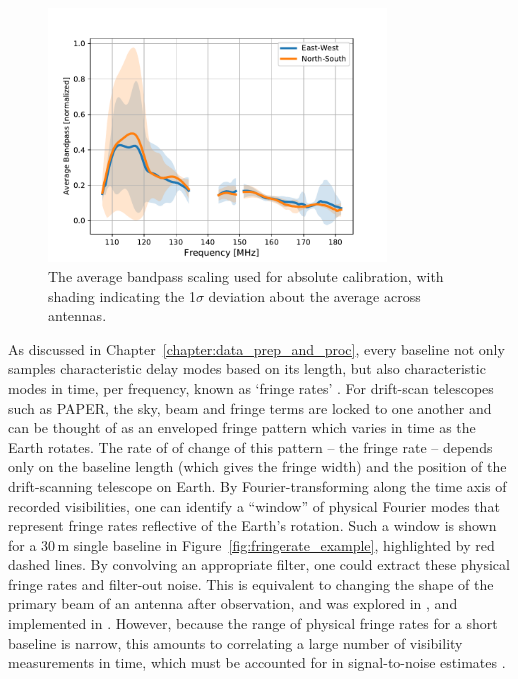 \begin{figure}
\centering
\includegraphics[width=0.8\textwidth]{chapters/psa128_pol/figures/avg_bandpasses.pdf}
\caption[The average bandpass scaling used for absolute calibration.]{The average bandpass scaling used for absolute calibration, with shading indicating the 1$\sigma$ deviation about the average across antennas.}
\label{fig:psa128_bandpases}
\end{figure}

As discussed in Chapter~\ref{chapter:data_prep_and_proc}, every baseline not only samples characteristic delay modes based on its length, but also characteristic modes in time, per frequency, known as `fringe rates' \citep[if frequency dependence is ignored, they are referred to as ``delay rates''; e.g.][]{ParsonsBacker.09}. For drift-scan telescopes such as PAPER, the sky, beam and fringe terms are locked to one another and can be thought of as an enveloped fringe pattern which varies in time as the Earth rotates. The rate of of change of this pattern -- the fringe rate -- depends only on the baseline length (which gives the fringe width) and the position of the drift-scanning telescope on Earth. By Fourier-transforming along the time axis of recorded visibilities, one can identify a ``window'' of physical Fourier modes that represent fringe rates reflective of the Earth's rotation. Such a window is shown for a 30\,m single baseline in Figure~\ref{fig:fringerate_example}, highlighted by red dashed lines. By convolving an appropriate filter, one could extract these physical fringe rates and filter-out noise. This is equivalent to changing the shape of the primary beam of an antenna after observation, and was explored in \cite{Parsons.15}, and implemented in \cite{Ali.15}. However, because the range of physical fringe rates for a short baseline is narrow, this amounts to correlating a large number of visibility measurements in time, which must be accounted for in signal-to-noise estimates \citep[][Cheng et al., \textit{submitted}]{Ali.15}.

